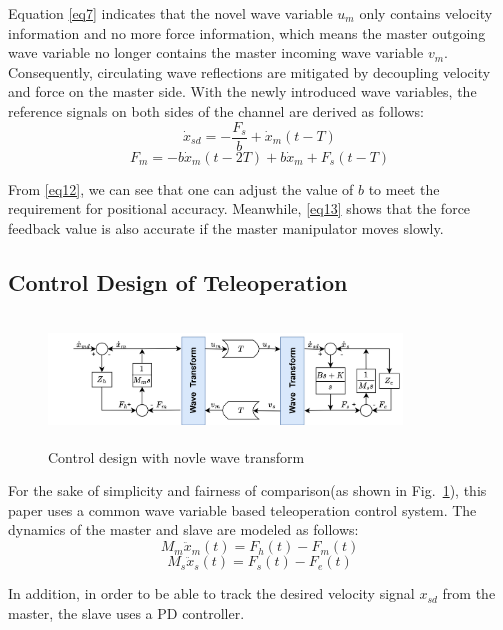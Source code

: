 \par Equation \eqref{eq7} indicates that the novel wave variable $u_m$ only contains velocity information 
and no more force information,
which means the master outgoing wave variable no longer contains the master incoming wave variable $v_m$.
Consequently, circulating wave reflections are 
mitigated by decoupling  velocity and force on the master side.
With the newly introduced wave variables,
the reference signals on both sides of the channel are derived as follows:
\begin{equation}
    {{{\dot{x}}}_{sd}}=-\frac{{{F}_{s}}}{b}+{{{\dot{x}}}_{m}}(t-T)  \label{eq12}
\end{equation}
\begin{equation}
    {{F}_{m}}=-b{{{\dot{x}}}_{m}}(t-2T)+b{{{\dot{x}}}_{m}}+{{F}_{s}}(t-T) \label{eq13}
\end{equation}
\par From \eqref{eq12},
we can see that one can adjust the value of $b$
to meet the requirement for positional accuracy.
Meanwhile, \eqref{eq13} shows that the force feedback value 
is also accurate if the master manipulator moves slowly.


\subsection{Control Design of Teleoperation}
\begin{figure}[htbp]
    \centerline{\includegraphics[height=3.4cm,width=9.4cm]{over_schemal.jpg}}
    \caption{Control design with novle wave transform}
    \label{fig4}
\end{figure}
\par For the sake of simplicity and fairness of comparison(as shown in Fig.~\ref{fig4}),
this paper uses a common wave variable based teleoperation control system.
The dynamics of the master and slave are modeled as follows:
\begin{equation}
    M_m \ddot x_m(t) = F_h(t)-F_m(t) \label{eqC}
\end{equation}
\begin{equation}
    M_s \ddot x_s(t) = F_s(t)-F_e(t) \label{eq14}
\end{equation}
\par In addition,
in order to be able to track the desired velocity signal $x_{sd}$ 
from the master, the slave uses a PD controller.

